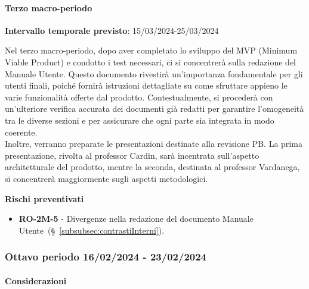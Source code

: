 \paragraph{Terzo macro-periodo}

\textbf{Intervallo temporale previsto}: 15/03/2024-25/03/2024 \\ 

\vspace{0.2cm}

Nel terzo macro-periodo, dopo aver completato lo sviluppo del MVP (Minimum Viable Product) e condotto i test necessari, ci si concentrerà sulla redazione del Manuale Utente. Questo documento rivestirà un'importanza fondamentale per gli utenti finali, poiché fornirà istruzioni dettagliate su come sfruttare appieno le varie funzionalità offerte dal prodotto.
Contestualmente, si procederà con un’ulteriore verifica accurata dei documenti già redatti per garantire l’omogeneità tra le diverse sezioni e per assicurare che ogni parte sia integrata in modo coerente. \\
Inoltre, verranno preparate le presentazioni destinate alla revisione PB. La prima presentazione, rivolta al professor Cardin, sarà incentrata sull'aspetto architetturale del prodotto, mentre la seconda, destinata al professor Vardanega, si concentrerà maggiormente sugli aspetti metodologici.

\vspace{0.4cm}

\textbf{Rischi preventivati}
\begin{itemize}
    \item \textbf{RO-2M-5} - Divergenze nella redazione del documento Manuale Utente~(\S~\ref{subsubsec:contrastiInterni}).
\end{itemize}


\subsubsection{Ottavo periodo  16/02/2024 - 23/02/2024}
\paragraph{Considerazioni}

